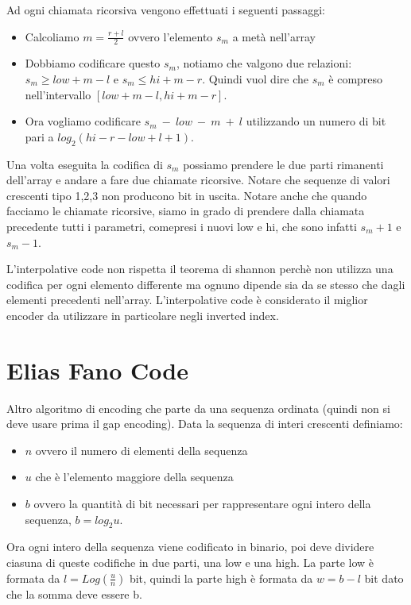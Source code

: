 \documentclass[14pt]{extreport}
\begin{document}
Ad ogni chiamata ricorsiva vengono effettuati i seguenti passaggi:
\begin{itemize}
\item Calcoliamo $m=\frac{r+l}{2}$ ovvero l'elemento $s_m$ a metà nell'array
\item Dobbiamo codificare questo $s_m$, notiamo che valgono due relazioni: $s_m \geq low+m-l$ e $s_m \leq hi+m-r$. Quindi vuol dire che $s_m$ è compreso nell'intervallo $[low+m-l, hi+m-r]$.
\item Ora vogliamo codificare $s_m\ -\ low\ - \ m\ +\ l$ utilizzando un numero di bit pari a $log_2(hi-r-low+l+1)$.
\end{itemize}

Una volta eseguita la codifica di $s_m$ possiamo prendere le due parti rimanenti dell'array e andare a fare due chiamate ricorsive. Notare che sequenze di valori crescenti tipo 1,2,3 non producono bit in uscita.
Notare anche che quando facciamo le chiamate ricorsive, siamo in grado di prendere dalla chiamata precedente tutti i parametri, comepresi i nuovi low e hi, che sono infatti $s_m+1$ e $s_m-1$.

L'interpolative code non rispetta il teorema di shannon perchè non utilizza una codifica per ogni elemento differente ma ognuno dipende sia da se stesso che dagli elementi precedenti nell'array.
L'interpolative code è considerato il miglior encoder da utilizzare in particolare negli inverted index.


\section{Elias Fano Code}

Altro algoritmo di encoding che parte da una sequenza ordinata (quindi non si deve usare prima il gap encoding).
Data la sequenza di interi crescenti definiamo:
\begin{itemize}
\item $n$ ovvero il numero di elementi della sequenza
\item $u$ che è l'elemento maggiore della sequenza
\item $b$ ovvero la quantità di bit necessari per rappresentare ogni intero della sequenza, $b=log_2 u$.
\end{itemize}

Ora ogni intero della sequenza viene codificato in binario, poi deve dividere ciasuna di queste codifiche in due parti, una low e una high. La parte low è formata da $l=Log(\frac{u}{n})$ bit, quindi la parte high è formata da $w=b-l$ bit dato che la somma deve essere b.
\end{document}
